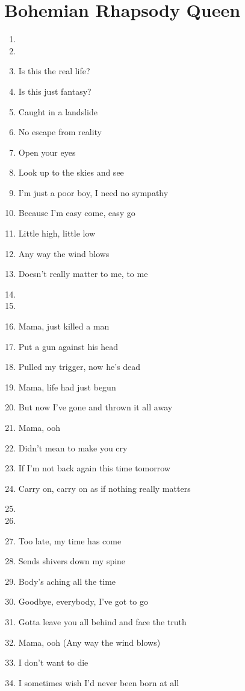 \documentclass{article}
\begin{document}
    \section*{Bohemian Rhapsody \by Queen}

    \begin{center}
        \begin{enumerate}

            \item[]
            \item[] \intro
            \item Is this the real life?
            \item Is this just fantasy?
            \item Caught in a landslide
            \item No escape from reality
            \item Open your eyes
            \item Look up to the skies and see
            \item I'm just a poor boy, I need no sympathy
            \item Because I'm easy come, easy go
            \item Little high, little low
            \item Any way the wind blows
            \item Doesn't really matter to me, to me

            \item[]
            \item[] 
            \item Mama, just killed a man
            \item Put a gun against his head
            \item Pulled my trigger, now he's dead
            \item Mama, life had just begun
            \item But now I've gone and thrown it all away
            \item Mama, ooh
            \item Didn't mean to make you cry
            \item If I'm not back again this time tomorrow
            \item Carry on, carry on as if nothing really matters

            \item[]
            \item[] 
            \item Too late, my time has come
            \item Sends shivers down my spine
            \item Body's aching all the time
            \item Goodbye, everybody, I've got to go
            \item Gotta leave you all behind and face the truth
            \item Mama, ooh (Any way the wind blows)
            \item I don't want to die
            \item I sometimes wish I'd never been born at all


\end{enumerate}
\end{center}
\end{document}
